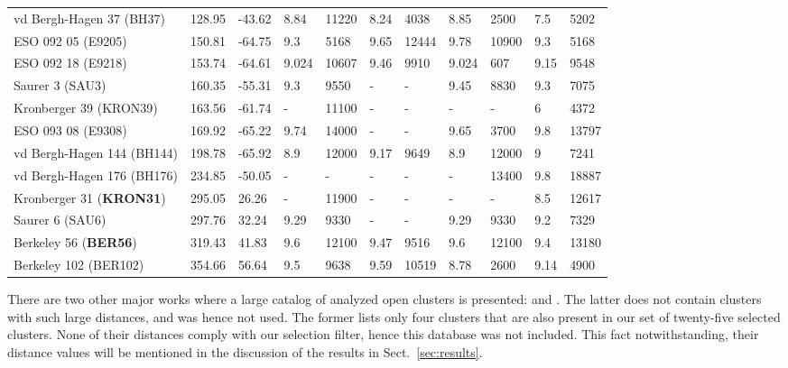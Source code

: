 \documentclass[draft]{aa}
\begin{document}
\begin{table}
\begin{tabular}{lllllllllll}
 vd Bergh-Hagen 37 (BH37)    & 128.95 & -43.62    & 8.84  & 11220 & 8.24 
 & 4038  & 8.85  & 2500  & 7.5   & 5202  \\
 ESO 092 05 (E9205)  & 150.81 & -64.75    & 9.3   & 5168  & 9.65  & 12444 &
 9.78  & 10900 & 9.3   & 5168  \\
 ESO 092 18 (E9218)  & 153.74 & -64.61    & 9.024 & 10607 & 9.46  & 9910  &
 9.024 & 607   & 9.15  & 9548  \\
 Saurer 3 (SAU3)   & 160.35 & -55.31    & 9.3   & 9550  & -   & -   & 9.45  &
 8830 & 9.3   & 7075  \\
 Kronberger 39 (KRON39)    & 163.56 & -61.74    & -   & 11100 & -   & -   & -   &
 -   & 6     & 4372  \\
 ESO 093 08 (E9308)  & 169.92 & -65.22    & 9.74  & 14000 & -   & -   & 9.65  &
 3700  & 9.8   & 13797 \\
 vd Bergh-Hagen 144 (BH144)   & 198.78 & -65.92    & 8.9   & 12000 & 9.17
 & 9649  & 8.9   & 12000 & 9     & 7241  \\
 vd Bergh-Hagen 176 (BH176)   & 234.85 & -50.05    & -   & -   & -   & - 
 & -   & 13400 & 9.8   & 18887 \\
 Kronberger 31 (\textbf{KRON31})    & 295.05 & 26.26     & -   & 11900 & -   & -   & -   &
 -   & 8.5   & 12617 \\
 Saurer 6 (SAU6)   & 297.76 & 32.24     & 9.29  & 9330  & -   & -   & 9.29  &
 9330 & 9.2   & 7329  \\
 Berkeley 56 (\textbf{BER56})     & 319.43 & 41.83     & 9.6   & 12100 & 9.47  & 9516  &
 9.6 & 12100 & 9.4   & 13180 \\
 Berkeley 102 (BER102)    & 354.66 & 56.64     & 9.5   & 9638  & 9.59  & 10519 &
 8.78  & 2600  & 9.14  & 4900 \\
 \hline
 \end{tabular}
 \end{table}

 There are two other major works where a large catalog of analyzed open clusters
 is presented: \cite{Lui_2019} and \cite{Dias_2021}. The latter does not contain
 clusters with such large distances, and was hence not used. The former lists
 only four clusters that are also present in our set of twenty-five selected
 clusters. None of their distances comply with our selection filter, hence this
 database was not included. This fact notwithstanding, their distance values will
 be mentioned in the discussion of the results in Sect.~\ref{sec:results}.\\
\end{document}
